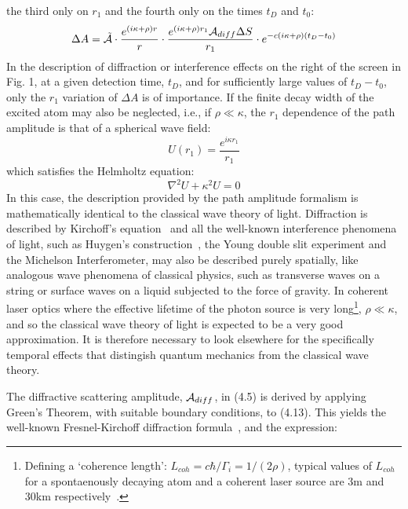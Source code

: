 { the third only
 on $r_1$ and the fourth only on the times $t_D$ and $t_0$:
 \begin{equation}
  \Delta A = \tilde{{\cal A}}\cdot \frac{e^{(i \kappa+ \rho)r}}{r} 
    \cdot \frac{e^{(i \kappa+ \rho)r_1}{\cal A}_{diff}\Delta S }{r_1}
    \cdot e^{-c(i \kappa+ \rho)(t_D-t_0)}
 \end{equation}
In the description of diffraction or interference effects on the right of the screen in Fig. 1, at a given
 detection time, $t_D$, and for sufficiently large values of $t_D-t_0$, only the
 $r_1$ variation of $\Delta A$ is of importance. If the finite decay width 
  of the excited atom may also be neglected, i.e., if $ \rho  \ll  \kappa$, the $r_1$ dependence of the
  path amplitude is that of a spherical wave field:
  \begin{equation}
   U(r_1) =  \frac{e^{i \kappa r_1}}{r_1}
 \end{equation}
 which satisfies the Helmholtz equation:
  \begin{equation}
  \nabla^2 U+\kappa^2 U = 0 
\end{equation}
 In this case, the description provided by the path amplitude formalism is mathematically
 identical to the classical wave theory of light. Diffraction is
  described by Kirchoff's equation~\cite{BW2,MW1} and all the well-known interference 
  phenomena of light, such as Huygen's construction~\cite{BW1}, the Young double slit experiment and
  the Michelson Interferometer, may also be described purely spatially,
  like analogous wave phenomena of classical physics, such as transverse waves on a
  string or surface
  waves on a liquid subjected to the force of gravity. In coherent laser optics where the
   effective lifetime of the photon source is very long\footnote{Defining a `coherence
   length': $L_{coh} = c \hbar/\Gamma_i = 1/(2\rho)$, typical values of $L_{coh}$ for 
  a spontaenously decaying atom and a coherent laser source are 3m and 30km respectively~\cite{MW2}.},
   $\rho \ll \kappa$,
   and so the classical wave theory of light is expected to be a very good approximation. It is therefore
  necessary to look elsewhere for the specifically temporal effects that distingish
  quantum mechanics from the classical wave theory.
  \par The diffractive scattering amplitude, ${\cal A}_{diff}$, in (4.5) is derived by applying Green's 
   Theorem, with suitable boundary conditions,
    to (4.13). This yields the well-known Fresnel-Kirchoff diffraction formula~\cite{BW2}, 
   and the expression:
       \begin{equation}

\end{equation}}
